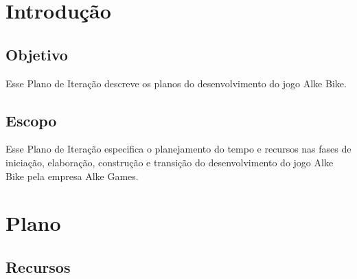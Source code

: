 \section{Introdução} 
\subsection{Objetivo}

Esse Plano de Iteração descreve os planos do desenvolvimento do jogo Alke Bike.

\subsection{Escopo}

Esse Plano de Iteração especifica o planejamento do tempo e recursos nas fases de iniciação, elaboração, construção e transição do desenvolvimento do jogo Alke Bike pela empresa Alke Games.

\section{Plano}

\subsection{Recursos}

